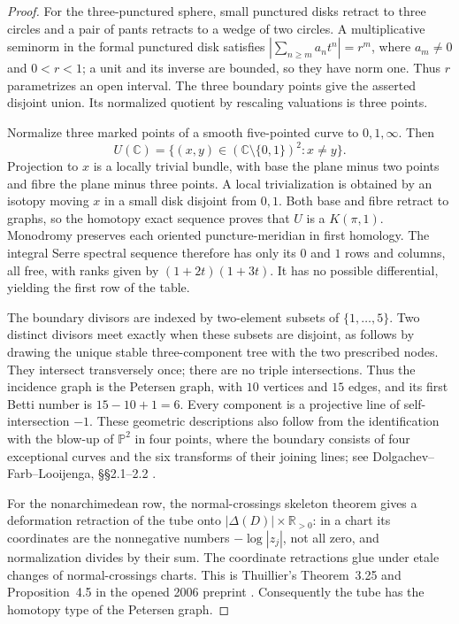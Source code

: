 \begin{proof}
For the three-punctured sphere, small punctured disks retract to three
circles and a pair of pants retracts to a wedge of two circles. A
multiplicative seminorm in the formal punctured disk satisfies
$|\sum_{n\geq m}a_nt^n|=r^m$, where $a_m\ne0$ and $0<r<1$; a unit and
its inverse are bounded, so they have norm one. Thus $r$ parametrizes an
open interval. The three boundary points give the asserted disjoint
union. Its normalized quotient by rescaling valuations is three points.

Normalize three marked points of a smooth five-pointed curve to
$0,1,\infty$. Then
\[
 U(\mathbb C)=\{(x,y)\in(\mathbb C\setminus\{0,1\})^2:x\ne y\}.
\]
Projection to $x$ is a locally trivial bundle, with base the plane minus
two points and fibre the plane minus three points. A local trivialization
is obtained by an isotopy moving $x$ in a small disk disjoint from $0,1$.
Both base and fibre retract to graphs, so the homotopy exact sequence
proves that $U$ is a $K(\pi,1)$. Monodromy preserves each oriented
puncture-meridian in first homology. The integral Serre spectral sequence
therefore has only its $0$ and $1$ rows and columns, all free, with ranks
given by $(1+2t)(1+3t)$. It has no possible differential, yielding the
first row of the table.

The boundary divisors are indexed by two-element subsets of
$\{1,\ldots,5\}$. Two distinct divisors meet exactly when these subsets
are disjoint, as follows by drawing the unique stable three-component
tree with the two prescribed nodes. They intersect transversely once;
there are no triple intersections. Thus the incidence graph is the
Petersen graph, with $10$ vertices and $15$ edges, and its first Betti
number is $15-10+1=6$. Every component is a projective line of
self-intersection $-1$. These geometric descriptions also follow from
the identification with the blow-up of $\mathbb P^2$ in four points,
where the boundary consists of four exceptional curves and the six
transforms of their joining lines; see Dolgachev--Farb--Looijenga,
\S\S2.1--2.2 \citep{DolgachevFarbLooijenga2018}.

For the nonarchimedean row, the normal-crossings skeleton theorem gives
a deformation retraction of the tube onto
$|\Delta(D)|\times\mathbb R_{>0}$: in a chart its coordinates are the
nonnegative numbers $-\log|z_j|$, not all zero, and normalization divides
by their sum. The coordinate retractions glue under etale changes of
normal-crossings charts. This is Thuillier's Theorem~3.25 and
Proposition~4.5 in the opened 2006 preprint \citep{Thuillier2006}.
Consequently the tube has the homotopy type of the Petersen graph.


\end{proof}
